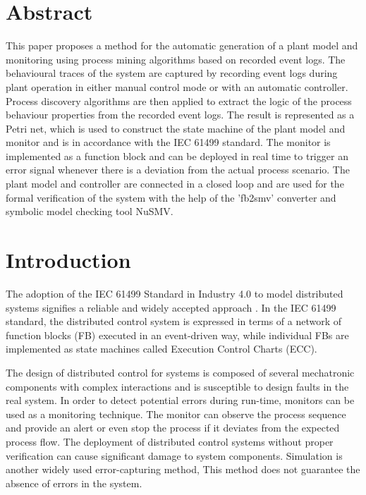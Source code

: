 \begin{bibunit}
\thispagestyle{plain}

\section*{Abstract}

This paper proposes a method for the automatic generation of a plant model and monitoring using process mining algorithms based on recorded event logs. The behavioural traces of the system are captured by recording event logs during plant operation in either manual control mode or with an automatic controller. Process discovery algorithms are then applied to extract the logic of the process behaviour properties from the recorded event logs. The result is represented as a Petri net, which is used to construct the state machine of the plant model and monitor and is in accordance with the IEC 61499 standard.  The monitor is implemented as a function block and can be deployed in  real time   to trigger an error signal whenever there is a deviation from the actual process scenario. The plant model and controller are connected in a closed loop and are used for the formal verification of the system with the help of the 'fb2smv' converter and symbolic model checking tool NuSMV.




\section{Introduction}

The adoption of the IEC 61499 \cite{iec61499part12012} Standard in Industry 4.0 to model distributed systems signifies a reliable and widely accepted approach \cite{dai2017discrete}. In the IEC 61499 standard, the distributed control system is expressed in terms of a network of function blocks (FB) executed in an event-driven way, while individual FBs are implemented as state machines \cite{dai2012redesign,lewis2001modelling,frey2006modeling} 
called Execution Control Charts (ECC).


The design of distributed control for systems is composed of several mechatronic components with complex interactions and is susceptible to design faults in the real system. In order to detect potential errors during run-time, monitors \cite{wenger2015behavioral,do2020towards} can be used as a monitoring technique. The monitor can observe the process sequence and provide an alert or even stop the process if it deviates from the expected process flow. The deployment of distributed control systems without proper verification can cause significant damage to system components. Simulation \cite{ hegny2010iec} is another widely used error-capturing method, This method does not guarantee the absence of errors in the system. 


\end{bibunit}
